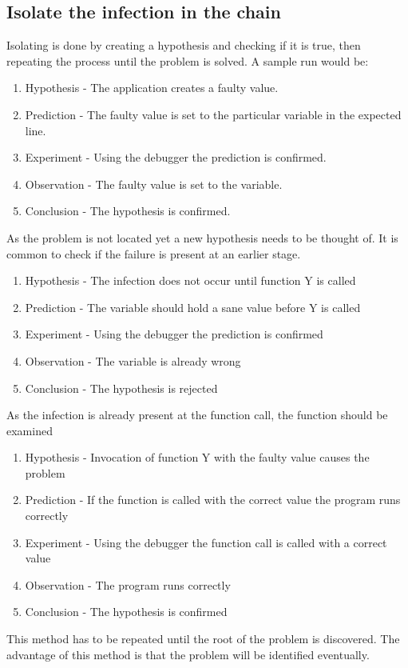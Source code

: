 \subsection{Isolate the infection in the chain}
Isolating is done by creating a hypothesis and checking if it is true, then repeating the process until the problem is solved. A sample run would be:
\begin{enumerate}
  \item Hypothesis - The application creates a faulty value.
  \item Prediction - The faulty value is set to the particular variable in the expected line.
  \item Experiment - Using the debugger the prediction is confirmed.
  \item Observation - The faulty value is set to the variable.
  \item Conclusion - The hypothesis is confirmed.
\end{enumerate}
As the problem is not located yet a new hypothesis needs to be thought of. It is common to check if the failure is present at an earlier stage.
\begin{enumerate}
  \item Hypothesis - The infection does not occur until function Y is called
  \item Prediction - The variable should hold a sane value before Y is called
  \item Experiment - Using the debugger the prediction is confirmed
  \item Observation - The variable is already wrong
  \item Conclusion - The hypothesis is rejected
\end{enumerate}
As the infection is already present at the function call, the function should be examined
\begin{enumerate}
  \item Hypothesis - Invocation of function Y with the faulty value causes the problem
  \item Prediction - If the function is called with the correct value the program runs correctly
  \item Experiment - Using the debugger the function call is called with a correct value
  \item Observation - The program runs correctly
  \item Conclusion - The hypothesis is confirmed
\end{enumerate}
This method has to be repeated until the root of the problem is discovered. The advantage of this method is that the problem will be identified eventually.


